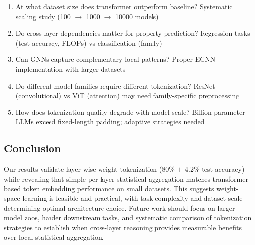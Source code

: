 \begin{enumerate}
\item At what dataset size does transformer outperform baseline? Systematic scaling study (100 $\rightarrow$ 1000 $\rightarrow$ 10000 models)

\item Do cross-layer dependencies matter for property prediction? Regression tasks (test accuracy, FLOPs) vs classification (family)

\item Can GNNs capture complementary local patterns? Proper EGNN implementation with larger datasets

\item Do different model families require different tokenization? ResNet (convolutional) vs ViT (attention) may need family-specific preprocessing

\item How does tokenization quality degrade with model scale? Billion-parameter LLMs exceed fixed-length padding; adaptive strategies needed
\end{enumerate}

\subsection{Conclusion}

Our results validate layer-wise weight tokenization (80\% $\pm$ 4.2\% test accuracy) while revealing that simple per-layer statistical aggregation matches transformer-based token embedding performance on small datasets. This suggests weight-space learning is feasible and practical, with task complexity and dataset scale determining optimal architecture choice. Future work should focus on larger model zoos, harder downstream tasks, and systematic comparison of tokenization strategies to establish when cross-layer reasoning provides measurable benefits over local statistical aggregation.
